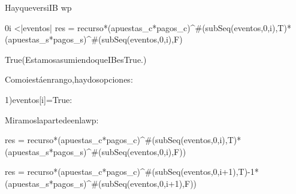 {Hay\hspace{3}que\hspace{3}ver\hspace{3}si\hspace{3}I\wedge B \rightarrow wp
\vspace{0.6cm}

 0\leq i <|eventos| \wedge res = recurso*(apuestas_c*pagos_c)^{\#(subSeq(eventos,0,i),T)}*(apuestas_s*pagos_s)^{\#(subSeq(eventos,0,i),F)}
 \vspace{0.2cm}

\equiv True\hspace{6}(Estamos\hspace{3}asumiendo\hspace{3}que\hspace{3}I\wedge B\hspace{3}es\hspace{3}True.)
\vspace{0.4cm}

Como\hspace{3}i\hspace{3}est\'a\hspace{3}en\hspace{3}rango,\hspace{3}hay\hspace{3}dos\hspace{3}opciones:
\hspace{3}

1)eventos[i]=True:
\vspace{0.2cm}

Miramos\hspace{3}la\hspace{3}parte\hspace{3}de\hspace{3}\star\hspace{3}en\hspace{3}la\hspace{3}wp:
\vspace{0.4cm}

 res = recurso*(apuestas_c*pagos_c)^{\#(subSeq(eventos,0,i),T)}*(apuestas_s*pagos_s)^{\#(subSeq(eventos,0,i),F)})
\vspace{0.2cm}

\rightarrow res = recurso*(apuestas_c*pagos_c)^{\#(subSeq(eventos,0,i+1),T)-1}*(apuestas_s*pagos_s)^{\#(subSeq(eventos,0,i+1),F)})
\vspace{0.4cm}

}

